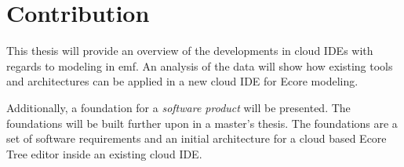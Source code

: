 \section{Contribution}

This thesis will provide an overview of the developments in \gls{cloud} \glspl{IDE} with regards to modeling in \gls{emf}.
An analysis of the data will show how existing tools and architectures can be applied in a new \gls{cloud} \gls{IDE} for \gls{Ecore} modeling.

Additionally, a foundation for a \emph{software product} will be presented.
The foundations will be built further upon in a master's thesis.
The foundations are a set of software requirements and an initial architecture for a \gls{cloud} based \gls{Ecore} Tree editor inside an existing \gls{cloud} \gls{IDE}.

